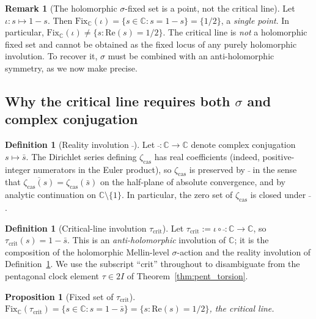\documentclass[11pt, a4paper]{amsart}
\newtheorem{proposition}[theorem]{Proposition}
\theoremstyle{definition}
\newtheorem{definition}[theorem]{Definition}
\newtheorem{remark}[theorem]{Remark}
\newcommand{\C}{\mathbb{C}}
\newcommand{\zetacas}{\zeta_{\mathrm{cas}}}
\begin{document}
\begin{remark}[The holomorphic $\sigma$-fixed set is a point, not the critical line]\label{rmk:sigma-fixed-point}
Let $\iota: s \mapsto 1-s$. Then $\mathrm{Fix}_{\C}(\iota) = \{s \in
\C : s = 1-s\} = \{1/2\}$, a \emph{single point}. In particular,
$\mathrm{Fix}_{\C}(\iota) \neq \{s : \mathrm{Re}(s) = 1/2\}$.
The critical line is \emph{not} a holomorphic
fixed set and cannot be obtained as the fixed locus of any purely
holomorphic involution. To recover it, $\sigma$ must be combined
with an anti-holomorphic symmetry, as we now make precise.
\end{remark}

\subsection{Why the critical line requires both $\sigma$ and complex conjugation}

\begin{definition}[Reality involution $\bar{\ }$]\label{def:reality}
Let $\bar{\ }: \C \to \C$ denote complex conjugation $s \mapsto
\bar{s}$. The Dirichlet series defining $\zetacas$ has real
coefficients (indeed, positive-integer numerators in the Euler
product), so $\zetacas$ is preserved by $\bar{\ }$ in the sense
that $\overline{\zetacas(s)} = \zetacas(\bar{s})$ on the
half-plane of absolute convergence, and by analytic continuation
on $\C \setminus \{1\}$. In particular, the zero set of
$\zetacas$ is closed under $\bar{\ }$.
\end{definition}

\begin{definition}[Critical-line involution $\tau_{\mathrm{crit}}$]\label{def:tau}
Let $\tau_{\mathrm{crit}} := \iota \circ \bar{\ } : \C \to \C$, so
$\tau_{\mathrm{crit}}(s) = 1 - \bar{s}$.
This is an \emph{anti-holomorphic} involution of $\C$; it is the
composition of the holomorphic Mellin-level $\sigma$-action and
the reality involution of Definition~\ref{def:reality}.  We use the
subscript ``crit'' throughout to disambiguate from the pentagonal
clock element $\tau \in 2I$ of Theorem~\ref{thm:pent_torsion}.
\end{definition}

\begin{proposition}[Fixed set of $\tau_{\mathrm{crit}}$]\label{prop:tau-fixed}
$\mathrm{Fix}_\C(\tau_{\mathrm{crit}}) = \{s \in \C : s = 1 - \bar{s}\}
= \{s : \mathrm{Re}(s) = 1/2\}$, the critical line.
\end{proposition}
\end{document}
